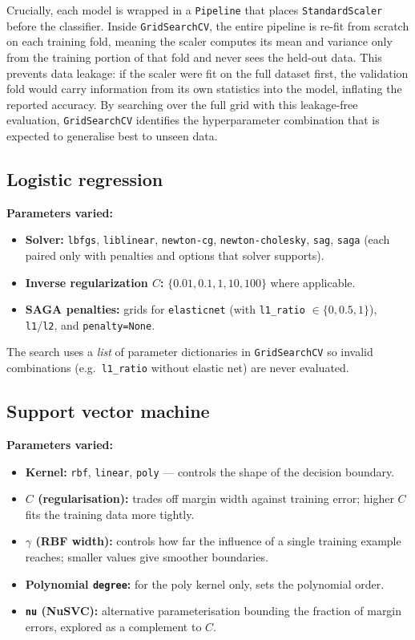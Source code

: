 \documentclass[11pt]{article}
\begin{document}
Crucially, each model is wrapped in a \texttt{Pipeline} that places \texttt{StandardScaler} before the classifier.
Inside \texttt{GridSearchCV}, the entire pipeline is re-fit from scratch on each training fold, meaning the scaler computes its mean and variance only from the training portion of that fold and never sees the held-out data.
This prevents data leakage: if the scaler were fit on the full dataset first, the validation fold would carry information from its own statistics into the model, inflating the reported accuracy.
By searching over the full grid with this leakage-free evaluation, \texttt{GridSearchCV} identifies the hyperparameter combination that is expected to generalise best to unseen data.

\subsection{Logistic regression}

\textbf{Parameters varied:}
\begin{itemize}
  \item \textbf{Solver:} \texttt{lbfgs}, \texttt{liblinear}, \texttt{newton-cg}, \texttt{newton-cholesky}, \texttt{sag}, \texttt{saga} (each paired only with penalties and options that solver supports).
  \item \textbf{Inverse regularization $C$:} $\{0.01, 0.1, 1, 10, 100\}$ where applicable.
  \item \textbf{SAGA penalties:} grids for \texttt{elasticnet} (with \texttt{l1\_ratio} $\in \{0, 0.5, 1\}$), \texttt{l1}/\texttt{l2}, and \texttt{penalty=None}.
\end{itemize}

The search uses a \emph{list} of parameter dictionaries in \texttt{GridSearchCV} so invalid combinations (e.g.\ \texttt{l1\_ratio} without elastic net) are never evaluated.

\subsection{Support vector machine}


\textbf{Parameters varied:}
\begin{itemize}
  \item \textbf{Kernel:} \texttt{rbf}, \texttt{linear}, \texttt{poly} — controls the shape of the decision boundary.
  \item \textbf{$C$ (regularisation):} trades off margin width against training error; higher $C$ fits the training data more tightly.
  \item \textbf{$\gamma$ (RBF width):} controls how far the influence of a single training example reaches; smaller values give smoother boundaries.
  \item \textbf{Polynomial \texttt{degree}:} for the poly kernel only, sets the polynomial order.
  \item \textbf{\texttt{nu} (NuSVC):} alternative parameterisation bounding the fraction of margin errors, explored as a complement to $C$.
\end{itemize}
\end{document}
